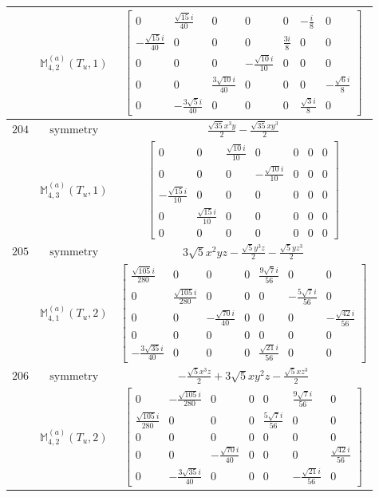 \documentclass[fleqn,8pt,landscape]{jsarticle}
\begin{document}
\begin{longtable}{ccc}
$  $ & $ \mathbb{M}_{4,2}^{(a)}(T_{u},1) $ & $ \begin{bmatrix} 0 & \frac{\sqrt{15} i}{40} & 0 & 0 & 0 & - \frac{i}{8} & 0 \\ - \frac{\sqrt{15} i}{40} & 0 & 0 & 0 & \frac{3 i}{8} & 0 & 0 \\ 0 & 0 & 0 & - \frac{\sqrt{10} i}{10} & 0 & 0 & 0 \\ 0 & 0 & \frac{3 \sqrt{10} i}{40} & 0 & 0 & 0 & - \frac{\sqrt{6} i}{8} \\ 0 & - \frac{3 \sqrt{5} i}{40} & 0 & 0 & 0 & \frac{\sqrt{3} i}{8} & 0 \end{bmatrix} $ \\ \hline
$ 204 $ & $ \text{symmetry} $ & $ \frac{\sqrt{35} x^{3} y}{2} - \frac{\sqrt{35} x y^{3}}{2} $ \\
$  $ & $ \mathbb{M}_{4,3}^{(a)}(T_{u},1) $ & $ \begin{bmatrix} 0 & 0 & \frac{\sqrt{10} i}{10} & 0 & 0 & 0 & 0 \\ 0 & 0 & 0 & - \frac{\sqrt{10} i}{10} & 0 & 0 & 0 \\ - \frac{\sqrt{15} i}{10} & 0 & 0 & 0 & 0 & 0 & 0 \\ 0 & \frac{\sqrt{15} i}{10} & 0 & 0 & 0 & 0 & 0 \\ 0 & 0 & 0 & 0 & 0 & 0 & 0 \end{bmatrix} $ \\ \hline
$ 205 $ & $ \text{symmetry} $ & $ 3 \sqrt{5} x^{2} y z - \frac{\sqrt{5} y^{3} z}{2} - \frac{\sqrt{5} y z^{3}}{2} $ \\
$  $ & $ \mathbb{M}_{4,1}^{(a)}(T_{u},2) $ & $ \begin{bmatrix} \frac{\sqrt{105} i}{280} & 0 & 0 & 0 & \frac{9 \sqrt{7} i}{56} & 0 & 0 \\ 0 & \frac{\sqrt{105} i}{280} & 0 & 0 & 0 & - \frac{5 \sqrt{7} i}{56} & 0 \\ 0 & 0 & - \frac{\sqrt{70} i}{40} & 0 & 0 & 0 & - \frac{\sqrt{42} i}{56} \\ 0 & 0 & 0 & 0 & 0 & 0 & 0 \\ - \frac{3 \sqrt{35} i}{40} & 0 & 0 & 0 & \frac{\sqrt{21} i}{56} & 0 & 0 \end{bmatrix} $ \\ \hline
$ 206 $ & $ \text{symmetry} $ & $ - \frac{\sqrt{5} x^{3} z}{2} + 3 \sqrt{5} x y^{2} z - \frac{\sqrt{5} x z^{3}}{2} $ \\
$  $ & $ \mathbb{M}_{4,2}^{(a)}(T_{u},2) $ & $ \begin{bmatrix} 0 & - \frac{\sqrt{105} i}{280} & 0 & 0 & 0 & \frac{9 \sqrt{7} i}{56} & 0 \\ \frac{\sqrt{105} i}{280} & 0 & 0 & 0 & \frac{5 \sqrt{7} i}{56} & 0 & 0 \\ 0 & 0 & 0 & 0 & 0 & 0 & 0 \\ 0 & 0 & - \frac{\sqrt{70} i}{40} & 0 & 0 & 0 & \frac{\sqrt{42} i}{56} \\ 0 & - \frac{3 \sqrt{35} i}{40} & 0 & 0 & 0 & - \frac{\sqrt{21} i}{56} & 0 \end{bmatrix} $ \\ \hline

\end{longtable}
\end{document}
